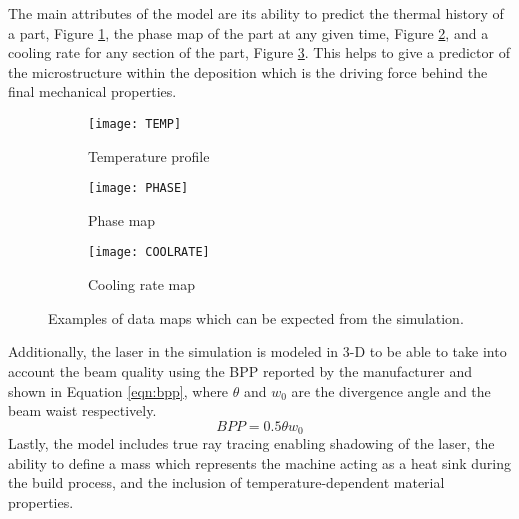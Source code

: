 The main attributes of the model are its ability to predict the thermal history of a part, Figure \ref{fig:TEMP}, the phase map of the part at any given time, Figure \ref{fig:PHASE}, and a cooling rate for any section of the part, Figure \ref{fig:COOLRATE}.  This helps to give a predictor of the microstructure within the deposition which is the driving force behind the final mechanical properties. 
\begin{figure}[!htb]\centering
    \begin{subfigure}[c]{0.3\textwidth}
	\centering
	\texttt{[image: TEMP]}
	\caption{Temperature profile}
	\label{fig:TEMP}
    \end{subfigure}
        \begin{subfigure}[c]{0.3\textwidth}
    	\centering
    	\texttt{[image: PHASE]}
    	\caption{Phase map}
    	\label{fig:PHASE}
        \end{subfigure}
            \begin{subfigure}[c]{0.3\textwidth}
            \centering
        	\texttt{[image: COOLRATE]}
        	\caption{Cooling rate map}
        	\label{fig:COOLRATE}
            \end{subfigure}
	\caption{Examples of data maps which can be expected from the simulation.}
	\label{fig:data_maps}	
\end{figure}
Additionally, the laser in the simulation is modeled in 3-D to be able to take into account the beam quality using the \ac{BPP} reported by the manufacturer and shown in Equation \ref{eqn:bpp}, where $\theta$ and $w_0$ are the divergence angle and the beam waist respectively.
\begin{equation}\label{eqn:bpp}
	BPP = 0.5 \theta w_0
\end{equation} 
Lastly, the model includes true ray tracing enabling shadowing of the laser, the ability to define a mass which represents the machine acting as a heat sink during the build process, and the inclusion of temperature-dependent material properties.

